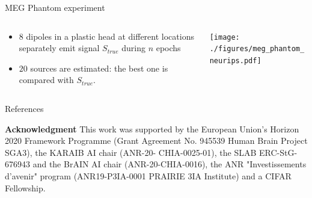 \documentclass[final]{beamer}
\newlength{\onecolwid}
\newlength{\onecolwidthree}
\begin{document}
\begin{frame}[t]
\begin{columns}[t]
\begin{column}{\onecolwidthree}
    \vspace{-1em}
    \begin{block}{MEG Phantom experiment}
      \begin{columns}

        \begin{column}{0.37 \textwidth}
          \begin{itemize}
            \item 8 dipoles in a plastic head at different locations separately
              emit signal $S_{true}$ during $n$ epochs
            \item $20$ sources are estimated: the best one is compared with $S_{true}$.
          \end{itemize}
    \end{column}

      \begin{column}{0.63 \textwidth}
    \begin{center}
      \texttt{[image: ./figures/meg\_phantom\_neurips.pdf]}
    \end{center}
  \end{column}
    \end{columns}
  \end{block}




\vspace{-1em}
\begin{block}{References}
  \nocite{*} %
    \printbibliography
\end{block}

\vspace{-1em}
  \small{
    \textbf{Acknowledgment} This work was supported by the European
    Union's Horizon 2020 Framework Programme (Grant Agreement No. 945539 Human Brain
    Project SGA3), the KARAIB AI chair (ANR-20-
    CHIA-0025-01), the SLAB ERC-StG-676943 and the BrAIN AI chair (ANR-20-CHIA-0016),
    the ANR "Investissements d'avenir" program (ANR19-P3IA-0001
    PRAIRIE 3IA Institute) and a CIFAR Fellowship.
  }


\end{column}
\end{columns}
\end{frame}
\end{document}
